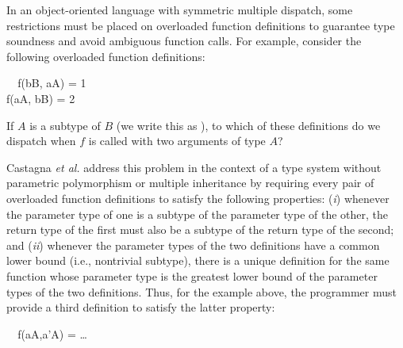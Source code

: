 
In an object-oriented language with symmetric multiple dispatch,
some restrictions must be placed on overloaded function definitions
to guarantee type soundness 
and avoid ambiguous function calls.
For example, 
consider the following overloaded function definitions:
\small
\begin{FortressCode}
{\tt ~~}\+f(b\COLONOP{}B, a\COLONOP{}A)\COLON {} = 1 \\
  f(a\COLONOP{}A, b\COLONOP{}B)\COLON {} = 2\-
\end{FortressCode}
\normalsize
If $A$ is a subtype of $B$ (we write this as ),
to which of these definitions do we dispatch 
when $f$ is called with two arguments of type $A$? 

Castagna \textit{et al.} \cite{castagna95} address this problem 
in the context of a type system 
without parametric polymorphism or multiple inheritance
by requiring every pair of overloaded function definitions 
to satisfy the following properties:
(\emph{i}) whenever the parameter type of one 
is a subtype of the parameter type of the other, 
the return type of the first
must also be a subtype of the return type of the second; 
and 
(\emph{ii}) whenever the parameter types of the two definitions 
have a common lower bound (i.e., nontrivial subtype), 
there is a unique definition for the same function 
whose parameter type is the greatest lower bound 
of the parameter types of the two definitions.
Thus, for the example above, 
the programmer must provide a third definition
to satisfy the latter property:
 \small
\begin{FortressCode}
{\tt ~~}\+f(a\COLONOP{}A,a'\COLONOP{}A)\COLON {} = \ldots\-
\end{FortressCode}
 \normalsize

